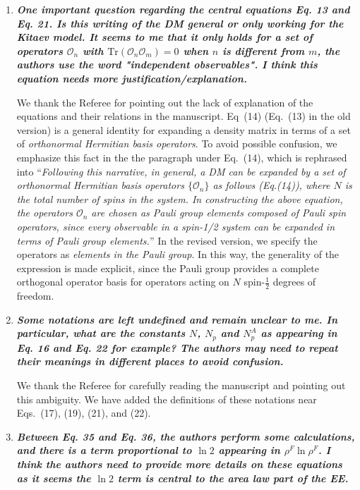 \documentclass[12pt]{article}
\begin{document}
\begin{enumerate}
    \item \textbf{\textit{One important question regarding the central equations Eq. 13 and Eq. 21. Is this writing of the DM general or only working for the Kitaev model. It seems to me that it only holds for a set of operators $\mathcal{O}_n$ with $\mathrm{Tr}(\mathcal{O}_n \mathcal{O}_m)=0$ when $n$ is different from $m$, the authors use the word "independent observables". I think this equation needs more justification/explanation.}}

    We thank the Referee for pointing out the lack of explanation of the equations and their relations in the manuscript. Eq~(14) (Eq.~(13) in the old version) is a general identity for expanding a density matrix in terms of a set of \textit{orthonormal Hermitian basis operators}. To avoid possible confusion, we emphasize this fact in the the paragraph under Eq.~(14), which is rephrased into ``\textit{Following this narrative, in general, a DM can be expanded by a set of orthonormal Hermitian basis operators $\{\mathcal{O}_n \}$ as follows (Eq.(14)), where $N$ is the total number of spins in the system. In constructing the above equation, the operators $\mathcal{O}_n$ are chosen as Pauli group elements composed of Pauli spin operators, since every observable in a spin-1/2 system can be expanded in terms of Pauli group elements.}'' In the revised version, we specify the operators as \textit{elements in the Pauli group}. In this way, the generality of the expression is made explicit, since the Pauli group provides a complete orthogonal operator basis for operators acting on $N$ spin-$\frac{1}{2}$ degrees of freedom.

    \item \textbf{\textit{Some notations are left undefined and remain unclear to me. In particular, what are the constants $N$, $N_p$ and $N^A_p$ as appearing in Eq. 16 and Eq. 22 for example? The authors may need to repeat their meanings in different places to avoid confusion.}}

    We thank the Referee for carefully reading the manuscript and pointing out this ambiguity. We have added the definitions of these notations near Eqs.~(17), (19), (21), and (22). 

    \item \textbf{\textit{Between Eq. 35 and Eq. 36, the authors perform some calculations, and there is a term proportional to $\ln2$ appearing in $\rho^F \ln\rho^F$. I think the authors need to provide more details on these equations as it seems the $\ln2$ term is central to the area law part of the EE.}}


\end{enumerate}
\end{document}
